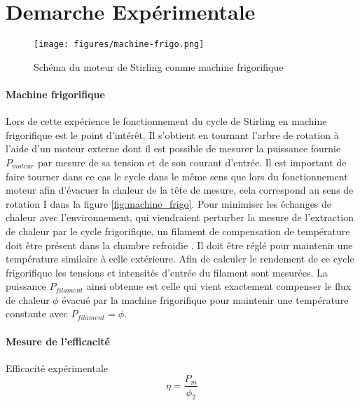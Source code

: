 \section{Demarche Expérimentale}






\begin{minipage}{\linewidth}
    \begin{wrapfigure}{R}{0.4\linewidth}
        \texttt{[image: figures/machine-frigo.png]}
        \caption{Schéma du moteur de Stirling comme machine frigorifique \cite{notice}}
        \label{fig:machine_frigo}
    \end{wrapfigure}

    \paragraph*{Machine frigorifique}
    Lors de cette expérience le fonctionnement du cycle de Stirling en machine frigorifique est le point d'intérêt. Il s'obtient en tournant l'arbre de rotation à l'aide d'un moteur externe dont il est possible de mesurer la puissance fournie \(P_{moteur}\) par mesure de sa tension et de son courant d'entrée. Il est important de faire tourner dans ce cas le cycle dans le même sens que lors du fonctionnement moteur afin d'évacuer la chaleur de la tête de mesure, cela correspond au sens de rotation I dans la figure \autoref{fig:machine_frigo}. Pour minimiser les échanges de chaleur avec l'environnement, qui viendraient perturber la mesure de l'extraction de chaleur par le cycle frigorifique, un filament de compensation de température doit être présent dans la chambre refroidie \cite{notice}. Il doit être réglé pour maintenir une température similaire à celle extérieure. Afin de calculer le rendement de ce cycle frigorifique les tensions et intensités d'entrée du filament sont mesurées. La puissance \(P_{filament}\) ainsi obtenue est celle qui vient exactement compenser le flux de chaleur \(\phi\) évacué par la machine frigorifique pour maintenir une température constante avec \(P_{filament} = \phi\).
\end{minipage}

\paragraph{Mesure de l'efficacité}

Efficacité expérimentale
\begin{equation}
    \eta = \frac{P_m}{\phi_2}
\end{equation}

